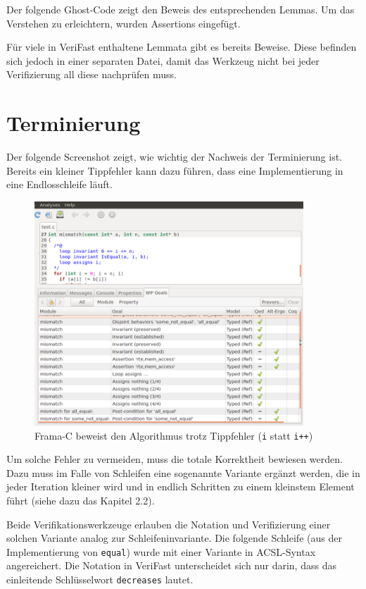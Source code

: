 Der folgende Ghost-Code zeigt den Beweis des entsprechenden Lemmas. Um das Verstehen zu erleichtern,
wurden Assertions eingefügt.


Für viele in VeriFast enthaltene Lemmata gibt es bereits Beweise. Diese befinden sich jedoch in einer separaten
Datei, damit das Werkzeug nicht bei jeder Verifizierung all diese nachprüfen muss.


\section{Terminierung}

Der folgende Screenshot zeigt, wie wichtig der Nachweis der Terminierung ist. Bereits ein kleiner Tippfehler kann dazu führen,
dass eine Implementierung in eine Endlosschleife läuft.

\begin{figure}[H]
	\centering
\includegraphics[width=0.9\textwidth]{images/frama-c-partial-correctness.png}
\caption{Frama-C beweist den Algorithmus trotz Tippfehler (\texttt{i} statt \texttt{i++})}
\end{figure}

Um solche Fehler zu vermeiden, muss die totale Korrektheit bewiesen werden. Dazu muss im Falle von Schleifen 
eine sogenannte Variante ergänzt werden, die in jeder Iteration kleiner wird und in endlich Schritten zu einem 
kleinstem Element führt (siehe dazu das Kapitel 2.2).

Beide Verifikationswerkzeuge erlauben die Notation und Verifizierung einer solchen Variante analog zur
Schleifeninvariante. Die folgende Schleife (aus der Implementierung von \texttt{equal}) wurde mit einer Variante 
in ACSL-Syntax angereichert. Die Notation in VeriFast unterscheidet sich nur darin, dass das einleitende
Schlüsselwort \texttt{decreases} lautet.

